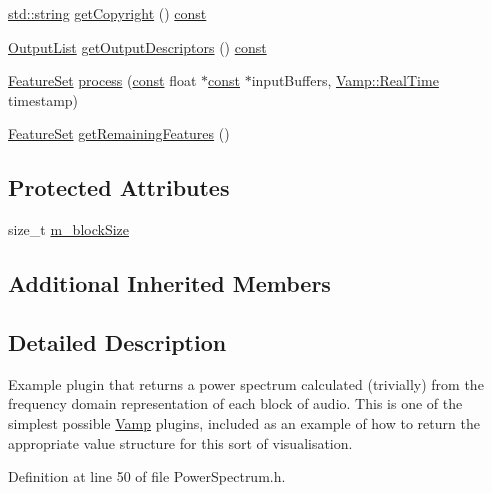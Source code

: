 \begin{DoxyCompactItemize}
\item 
\hyperlink{test__lib_f_l_a_c_2format_8c_ab02026ad0de9fb6c1b4233deb0a00c75}{std\+::string} \hyperlink{class_power_spectrum_a708b4d335c57643d5ef2b2e1caf43bd9}{get\+Copyright} () \hyperlink{getopt1_8c_a2c212835823e3c54a8ab6d95c652660e}{const} 
\item 
\hyperlink{class_vamp_1_1_plugin_a30f531b8fb69fac41a24e3d2a6a08ed9}{Output\+List} \hyperlink{class_power_spectrum_a6aac5f93e3a8c033026d739fed427242}{get\+Output\+Descriptors} () \hyperlink{getopt1_8c_a2c212835823e3c54a8ab6d95c652660e}{const} 
\item 
\hyperlink{class_vamp_1_1_plugin_a448fb57dc245d47923ec9eeaf9856c5f}{Feature\+Set} \hyperlink{class_power_spectrum_aa5664ffc2b37a16db471fae791c1f55f}{process} (\hyperlink{getopt1_8c_a2c212835823e3c54a8ab6d95c652660e}{const} float $\ast$\hyperlink{getopt1_8c_a2c212835823e3c54a8ab6d95c652660e}{const} $\ast$input\+Buffers, \hyperlink{struct_vamp_1_1_real_time}{Vamp\+::\+Real\+Time} timestamp)
\item 
\hyperlink{class_vamp_1_1_plugin_a448fb57dc245d47923ec9eeaf9856c5f}{Feature\+Set} \hyperlink{class_power_spectrum_ac8a9661a785d38f4c5ce8ca2d53e69f9}{get\+Remaining\+Features} ()
\end{DoxyCompactItemize}
\subsection*{Protected Attributes}
\begin{DoxyCompactItemize}
\item 
size\+\_\+t \hyperlink{class_power_spectrum_a399e997c033f26b07edb7cc83cd5a6d8}{m\+\_\+block\+Size}
\end{DoxyCompactItemize}
\subsection*{Additional Inherited Members}


\subsection{Detailed Description}
Example plugin that returns a power spectrum calculated (trivially) from the frequency domain representation of each block of audio. This is one of the simplest possible \hyperlink{namespace_vamp}{Vamp} plugins, included as an example of how to return the appropriate value structure for this sort of visualisation. 

Definition at line 50 of file Power\+Spectrum.\+h.



